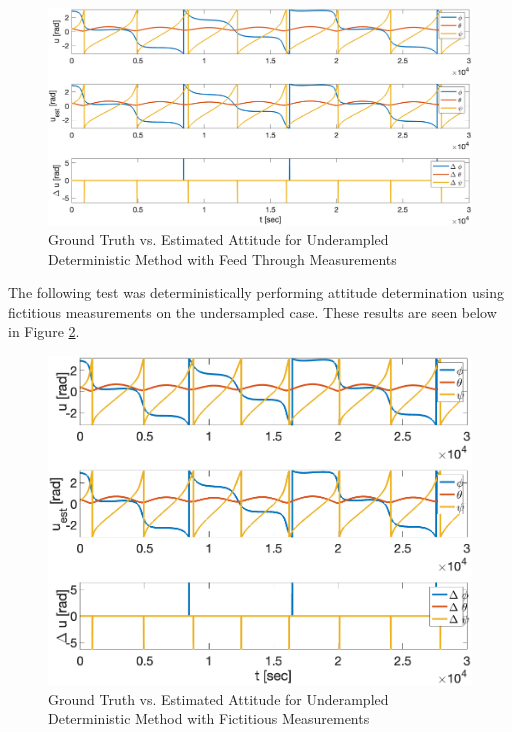 \begin{figure}[H]
    \centering
    \captionsetup{ justification = centering }
    \includegraphics[width = 12cm]{Images/PS6/attitude_estimation_undersampled_det_default.png}
    \caption{Ground Truth vs. Estimated Attitude for Underampled Deterministic Method with Feed Through Measurements}
    \label{fig:det_attitude_undersampled_default}
\end{figure}

The following test was deterministically performing attitude determination using fictitious measurements on the undersampled case. These results are seen below in Figure \ref{fig:det_attitude_undersampled_fictitious}. 

\begin{figure}[H]
    \centering
    \captionsetup{ justification = centering }
    \includegraphics[width = 12cm]{Images/PS6/attitude_estimation_undersampled_det_fictitious.png}
    \caption{Ground Truth vs. Estimated Attitude for Underampled Deterministic Method with Fictitious Measurements}
    \label{fig:det_attitude_undersampled_fictitious}
\end{figure}

